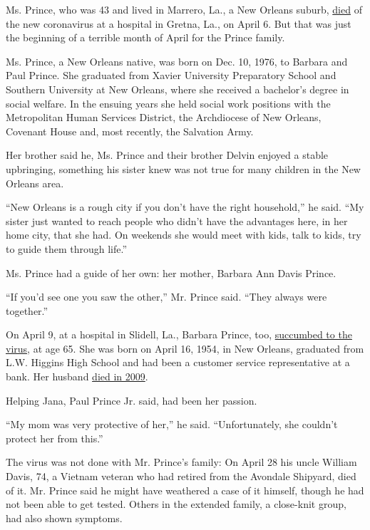 Ms. Prince, who was 43 and lived in Marrero, La., a New Orleans suburb,
\href{https://obits.nola.com/obituaries/nola/obituary.aspx?n=jana-marie-prince\&pid=196003992\&fhid=25202}{died}
of the new coronavirus at a hospital in Gretna, La., on April 6. But
that was just the beginning of a terrible month of April for the Prince
family.

Ms. Prince, a New Orleans native, was born on Dec. 10, 1976, to Barbara
and Paul Prince. She graduated from Xavier University Preparatory School
and Southern University at New Orleans, where she received a bachelor's
degree in social welfare. In the ensuing years she held social work
positions with the Metropolitan Human Services District, the Archdiocese
of New Orleans, Covenant House and, most recently, the Salvation Army.

Her brother said he, Ms. Prince and their brother Delvin enjoyed a
stable upbringing, something his sister knew was not true for many
children in the New Orleans area.

``New Orleans is a rough city if you don't have the right household,''
he said. ``My sister just wanted to reach people who didn't have the
advantages here, in her home city, that she had. On weekends she would
meet with kids, talk to kids, try to guide them through life.''

Ms. Prince had a guide of her own: her mother, Barbara Ann Davis Prince.

``If you'd see one you saw the other,'' Mr. Prince said. ``They always
were together.''

On April 9, at a hospital in Slidell, La., Barbara Prince, too,
\href{https://obits.nola.com/obituaries/nola/obituary.aspx?n=barbara-ann-davis-prince\&pid=196004113\&fhid=25202}{succumbed
to the virus}, at age 65. She was born on April 16, 1954, in New
Orleans, graduated from L.W. Higgins High School and had been a customer
service representative at a bank. Her husband
\href{https://www.legacy.com/obituaries/name/paul-prince-obituary?pid=131655841}{died
in 2009}.

Helping Jana, Paul Prince Jr. said, had been her passion.

``My mom was very protective of her,'' he said. ``Unfortunately, she
couldn't protect her from this.''

The virus was not done with Mr. Prince's family: On April 28 his uncle
William Davis, 74, a Vietnam veteran who had retired from the Avondale
Shipyard, died of it. Mr. Prince said he might have weathered a case of
it himself, though he had not been able to get tested. Others in the
extended family, a close-knit group, had also shown symptoms.

